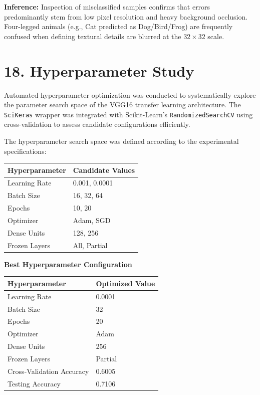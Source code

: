 \documentclass[11pt]{article}
\begin{document}
\textbf{Inference:} Inspection of misclassified samples confirms that errors predominantly stem from low pixel resolution and heavy background occlusion. Four-legged animals (e.g., Cat predicted as Dog/Bird/Frog) are frequently confused when defining textural details are blurred at the $32\times32$ scale.

\section*{18. Hyperparameter Study}

Automated hyperparameter optimization was conducted to systematically explore the parameter search space of the VGG16 transfer learning architecture. The \texttt{SciKeras} wrapper was integrated with Scikit-Learn's \texttt{RandomizedSearchCV} using cross-validation to assess candidate configurations efficiently.

The hyperparameter search space was defined according to the experimental specifications:

\begin{center}
\begin{tabular}{|p{5cm}|p{7cm}|}
\hline
Hyperparameter & Candidate Values\\
\hline
Learning Rate & 0.001, 0.0001\\
Batch Size & 16, 32, 64\\
Epochs & 10, 20\\
Optimizer & Adam, SGD\\
Dense Units & 128, 256\\
Frozen Layers & All, Partial\\
\hline
\end{tabular}
\end{center}

\textbf{Best Hyperparameter Configuration}

\begin{center}
\begin{tabular}{|p{6cm}|p{6cm}|}
\hline
\textbf{Hyperparameter} & \textbf{Optimized Value} \\
\hline
Learning Rate & 0.0001 \\
\hline
Batch Size & 32 \\
\hline
Epochs & 20 \\
\hline
Optimizer & Adam \\
\hline
Dense Units & 256 \\
\hline
Frozen Layers & Partial \\
\hline
Cross-Validation Accuracy & 0.6005 \\
\hline
Testing Accuracy & 0.7106 \\
\hline
\end{tabular}
\end{center}
\end{document}
